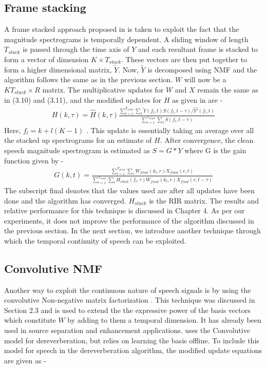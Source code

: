 \subsection{Frame stacking} 
A frame stacked approach proposed in \cite{moham} is taken to exploit the fact that the magnitude spectrograms is temporally dependent. A sliding window of length $T_{stack}$ is passed through the time axis of $Y$ and each resultant frame is stacked to form a vector of dimension $K \times T_{stack}$. These vectors are then put together to form a higher dimensional matrix, $\tilde{Y}$. Now, $\tilde{Y}$ is decomposed using NMF and the algorithm follows the same as in the previous section. $W$ will now be a $KT_{stack} \times R$ matrix. The multiplicative updates for $W$ and $X$ remain the same as in (3.10) and (3.11), and the modified updates for $H$ as given in \cite{moham} are -
\begin{align}H(k,\tau) = \hat{H}(k, \tau)\frac{\sum_{l=1}^{T_{stack}}\sum_{t}\tilde{Y}(f_l,t)S(f_l,t -\tau)/\hat{Y'}(f_l,t)}{\sum_{l=1}^{T_{stack}}\sum_{t}S(f_l,t - \tau)}
\end{align}
Here, $f_l = k + l(K-1)$ . This update is essentially taking an average over all the stacked up spectrograms for an estimate of $H$. After convergence, the clean speech magnitude spectrogram is estimated as $S=G*Y$ where G is the gain function given by -
\begin{align}
G(k,t) = \frac{\sum_{l=1}^{T_{stack}}\sum_{r}W_{final}(k_l,r)X_{final}(r,t)}{\sum_{l=1}^{T_{stack}}\sum_{t}H_{stack}(f_l,\tau)W_{final}(k_l,r)X_{final}(r,t- \tau)}
\end{align}
The subscript final denotes that the values used are after all updates have been done and the algorithm has converged. $H_{stack}$ is the RIR matrix. The results and relative performance for this technique is discussed in Chapter 4. As per our experiments, it does not improve the performance of the algorithm discussed in the previous section. In the next section, we introduce another technique through which the temporal continuity of speech can be exploited.

\subsection{Convolutive NMF}
Another way to exploit the continuous nature of speech signals is by using the convolutive Non-negative matrix factorization . This technique was discussed in Section 2.3 and is used to extend the the expressive power of the basis vectors which constitute $W$ by adding to them a temporal dimension. It has already been used in source separation and enhancement applications. \cite{baby} uses the Convolutive model for dereverberation, but relies on learning the basis offline.
To include this model for speech in the dereverberation algorithm, the modified update equations are given as - 



